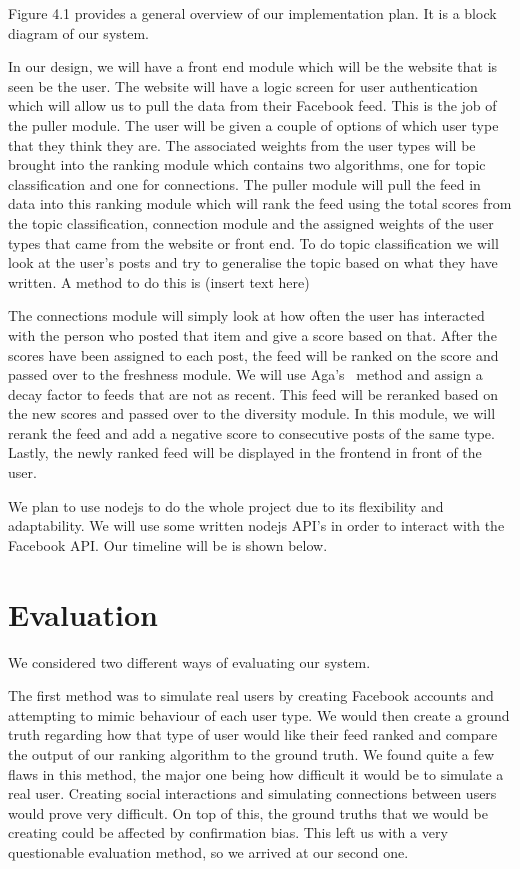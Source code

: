 Figure 4.1 provides a general overview of our implementation plan. It is a block diagram of our system. 

In our design, we will have a front end module which will be the website that is seen be the user. The website will have a logic screen for user authentication which will allow us to pull the data from their Facebook feed. This is the job of the puller module.  The user will be given a couple of options of which user type that they think they are. The associated weights from the user types will be brought into the ranking module which contains two algorithms, one for topic classification and one for connections. The puller module will pull the feed in data into this ranking module which will rank the feed using the total scores from the topic classification, connection module and the assigned weights of the user types that came from the website or front end. To do topic classification we will look at the user's posts and try to generalise the topic based on what they have written. A method to do this is (insert text here)

The connections module will simply look at how often the user has interacted with the person who posted that item and give a score based on that. After the scores have been assigned to each post,  the feed will be ranked on the score and passed over to the freshness module. We will use Aga's~\cite{Aga2014} method and assign a decay factor to feeds that are not as recent. This feed will be reranked based on the new scores and passed over to the diversity module. In this module, we will rerank the feed and add a negative score to consecutive posts of the same type. Lastly, the newly ranked feed will be displayed in the frontend in front of the user.

We plan to use nodejs to do the whole project due to its flexibility and adaptability. We will use some written nodejs API's in order to interact with the Facebook API. 
Our timeline will be is shown below.

\section {Evaluation}

We considered two different ways of evaluating our system.

The first method was to simulate real users by creating Facebook accounts and attempting to mimic behaviour of each user type. We would then create a ground truth regarding how that type of user would like their feed ranked and compare the output of our ranking algorithm to the ground truth. We found quite a few flaws in this method, the major one being how difficult it would be to simulate a real user. Creating social interactions and simulating connections between users would prove very difficult. On top of this, the ground truths that we would be creating could be affected by confirmation bias. This left us with a very questionable evaluation method, so we arrived at our second one.

